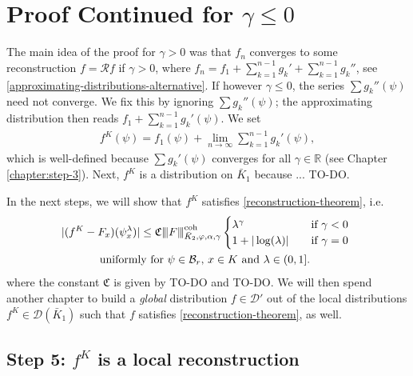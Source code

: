 


\chapter{Proof Continued for \texorpdfstring{$\gamma \leq 0$}{gamma <= 0}}\label{chapter:proof-gamma-negative}

The main idea of the proof for $\gamma > 0$ was that $f_n$ converges to some reconstruction $f = \mathcal{R}f$ if $\gamma > 0$, where $f_n = f_1 + \sum\limits^{n-1}_{k=1} g_k'  + \sum\limits^{n-1}_{k=1} g_k''$, see \eqref{approximating-distributions-alternative}.   
If however $\gamma \leq 0$, the series $\sum g_k''(\psi)$ need not converge. We fix this by ignoring $\sum g_k''(\psi)$; the approximating distribution then reads $f_1 + \sum\limits^{n-1}_{k=1} g_k'(\psi)$. We set 
\begin{align*}
    f^K(\psi) = f_1(\psi) + \lim_{n\to \infty}\sum^{n-1}_{k=1} g_k'(\psi),
\end{align*}
which is well-defined because $\sum g_k'(\psi)$ converges for all $\gamma \in \mathbb{R}$ (see Chapter \ref{chapter:step-3}).  Next, $f^K$ is a distribution on $\bar K_1$ because ... TO-DO.

In the next steps, we will show that $f^K$ satisfies  \eqref{reconstruction-theorem}, i.e.
\begin{gather*}
    |(f^K - F_x)(\psi_x^\lambda)| \leq \mathfrak{C} {\left\vert\kern-0.25ex\left\vert\kern-0.25ex\left\vert F \right\vert\kern-0.25ex\right\vert\kern-0.25ex\right\vert}^{\mathrm{coh}}_{\bar K_{2},\varphi,\alpha,\gamma} \begin{cases}
        \lambda^\gamma  &\text{if $\gamma < 0$}\\
        1 + |\log(\lambda)| \quad &\text{if $\gamma = 0$ } 
    \end{cases}
    \\
    \text{uniformly for $\psi \in \mathcal{B}_r$, $x \in K$ and $\lambda \in(0,1]$.   }
\end{gather*}
where the constant $\mathfrak{C}$ is given by TO-DO and TO-DO. We will then spend another chapter to build a \emph{global} distribution $f \in \mathcal{D}'$ out of the local distributions $f^K \in \mathcal{D}(\bar K_1)$ such that $f$ satisfies  \eqref{reconstruction-theorem}, as well.

\section{Step 5: \texorpdfstring{$f^K$ is a local reconstruction}{fK is a local reconstruction}}
 
